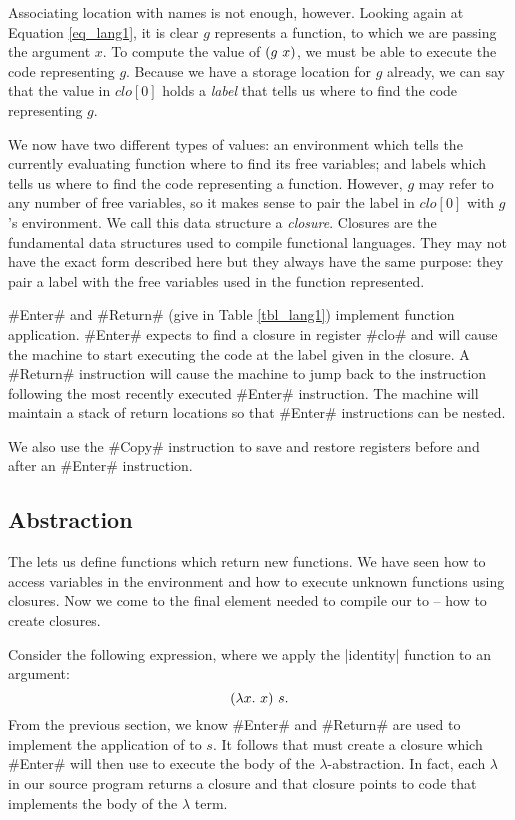 \documentclass[12pt]{report}
\begin{document}
Associating location with names is not enough, however. Looking again
at Equation \ref{eq_lang1}, it is clear $g$ represents a function, to
which we are passing the argument $x$. To compute the value of
$(g\ x)$, we must be able to execute the code representing
$g$. Because we have a storage location for $g$ already, we can
say that the value in $clo[0]$ holds a \emph{label} that tells us
where to find the code representing $g$. 

We now have two different types of values: an environment which tells
the currently evaluating function where to find its free variables;
and labels which tells us where to find the code representing a
function. However, $g$ may refer to any number of free variables, so
it makes sense to pair the label in $clo[0]$ with $g$'s
environment. We call this data structure a \emph{closure}. Closures
are the fundamental data structures used to compile functional
languages. They may not have the exact form described here but they
always have the same purpose: they pair a label with the free
variables used in the function represented.

#Enter# and #Return# (give in Table \ref{tbl_lang1}) implement
function application. #Enter# expects to find a closure in register
#clo# and will cause the machine to start executing the code at the
label given in the closure. A #Return# instruction will cause the
machine to jump back to the instruction following the most recently
executed #Enter# instruction. The machine will maintain a stack of
return locations so that #Enter# instructions can be nested.

We also use the #Copy# instruction to save and restore registers before
and after an #Enter# instruction. 

\subsection{Abstraction}
The \lamA lets us define functions which return new functions. We have
seen how to access variables in the environment and how to execute
unknown functions using closures. Now we come to the final element
needed to compile our \lamA to \machLam -- how to create
closures.

Consider the following expression, where we apply the |identity|
function to an argument:
\[(\lambda x.\ x)\ s.\]
From the previous section, we know #Enter# and #Return# are used to
implement the application of  to $s$. It follows that
 must create a closure which #Enter# will then use to
execute the body of the $\lambda$-abstraction. In fact, each
$\lambda$ in our source program returns a closure and that closure
points to code that implements the body of the $\lambda$ term.
\end{document}
